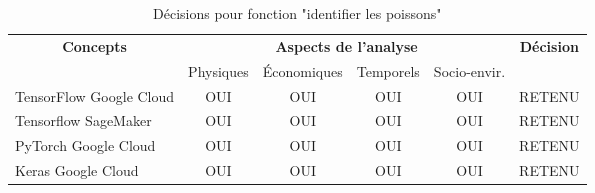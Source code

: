 


\begin{table}[!htbp]
	\begin{tabular}{|l|c|c|c|c|c|}
		\hline
		\multicolumn{1}{|c|}{\multirow{2}{*}{\textbf{Concepts}}} & \multicolumn{4}{c|}{\textbf{Aspects de l'analyse}} & \multirow{2}{*}{\textbf{Décision}} \\ \cline{2-5}
		\multicolumn{1}{|c|}{}                                   & Physiques & Économiques & Temporels & Socio-envir. &                                    \\ \hline
		TensorFlow Google Cloud                                                 & OUI       & OUI         & OUI       & OUI          & RETENU                             \\ \hline
		Tensorflow SageMaker                                                 & OUI       & OUI         & OUI       & OUI          & RETENU                             \\ \hline
		PyTorch Google Cloud                                                 & OUI       & OUI         & OUI       & OUI          & RETENU                             \\ \hline
		Keras Google Cloud                                                 & OUI       & OUI         & OUI       & OUI          & RETENU	        \\ \hline
	\end{tabular}
	\caption{Décisions pour fonction "identifier les poissons"}
	\label{tab:fct_identifier}
\end{table}